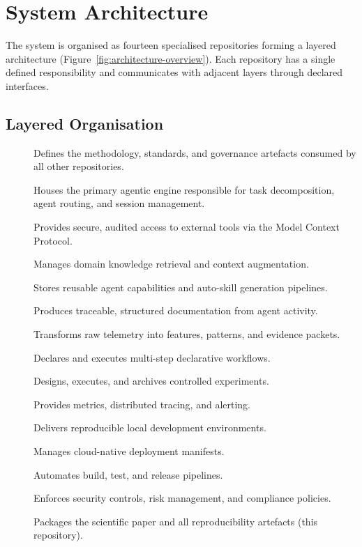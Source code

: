 \section{System Architecture}
\label{sec:architecture}

The system is organised as fourteen specialised repositories forming a layered
architecture (Figure~\ref{fig:architecture-overview}). Each repository has a
single defined responsibility and communicates with adjacent layers through
declared interfaces.

\subsection{Layered Organisation}

\begin{description}
  \item[] Defines the methodology, standards, and
    governance artefacts consumed by all other repositories.
  \item[] Houses the primary agentic engine
    responsible for task decomposition, agent routing, and session management.
  \item[] Provides secure, audited access to external
    tools via the Model Context Protocol.
  \item[] Manages domain knowledge retrieval
    and context augmentation.
  \item[] Stores reusable agent capabilities
    and auto-skill generation pipelines.
  \item[] Produces traceable, structured
    documentation from agent activity.
  \item[] Transforms raw telemetry into features,
    patterns, and evidence packets.
  \item[] Declares and executes multi-step
    declarative workflows.
  \item[] Designs, executes, and archives
    controlled experiments.
  \item[] Provides metrics, distributed tracing,
    and alerting.
  \item[] Delivers reproducible local development
    environments.
  \item[] Manages cloud-native deployment manifests.
  \item[] Automates build, test, and release
    pipelines.
  \item[] Enforces security controls,
    risk management, and compliance policies.
  \item[] Packages the scientific paper and
    all reproducibility artefacts (this repository).
\end{description}

